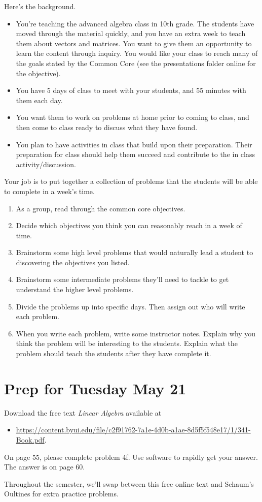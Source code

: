 \documentclass[letterpaper,oneside]{book}%
\theoremstyle{plain}
\theoremstyle{box}
\theoremstyle{problem}
\newtheorem*{hwenum*}{Home Work Practice}
\newenvironment{hw*}[1][]{\begin{hwenum*}[#1]}{\end{hwenum*}\nopagebreak\hrule\bigskip}
\begin{document}
Here's the background.
\begin{itemize}
 \item You're teaching the advanced algebra class in 10th grade. The students have moved through the material quickly, and you have an extra week to teach them about vectors and matrices. You want to give them an opportunity to learn the content through inquiry. You would like your class to reach many of the goals stated by the Common Core (see the presentations folder online for the objective).
 \item You have 5 days of class to meet with your students, and 55 minutes with them each day.
 \item You want them to work on problems at home prior to coming to class, and then come to class ready to discuss what they have found. 
 \item You plan to have activities in class that build upon their preparation. Their preparation for class should help them succeed and contribute to the in class activity/discussion.
\end{itemize}
Your job is to put together a collection of problems that the students will be able to complete in a week's time.
\begin{enumerate}
 \item As a group, read through the common core objectives. 
 \item Decide which objectives you think you can reasonably reach in a week of time.
 \item Brainstorm some high level problems that would naturally lead a student to discovering the objectives you listed.
 \item Brainstorm some intermediate problems they'll need to tackle to get understand the higher level problems.  
 \item Divide the problems up into specific days. Then assign out who will write each problem.
 \item When you write each problem, write some instructor notes.  Explain why you think the problem will be interesting to the students. Explain what the problem should teach the students after they have complete it. 
\end{enumerate}




\section{Prep for Tuesday May 21}
\begin{hw*}
 Download the free text {\it Linear Algebra} available at
 \begin{itemize}
  \item \href{https://content.byui.edu/file/c2f91762-7a1e-4d0b-a1ae-8d5f5f548e17/1/341-Book.pdf}{https://content.byui.edu/file/c2f91762-7a1e-4d0b-a1ae-8d5f5f548e17/1/341-Book.pdf}.
 \end{itemize}
 On page 55, please complete problem 4f.  Use software to rapidly get your answer. The answer is on page 60.  
 
 Throughout the semester, we'll swap between this free online text and Schaum's Oultines for extra practice problems.
\end{hw*}
\end{document}
